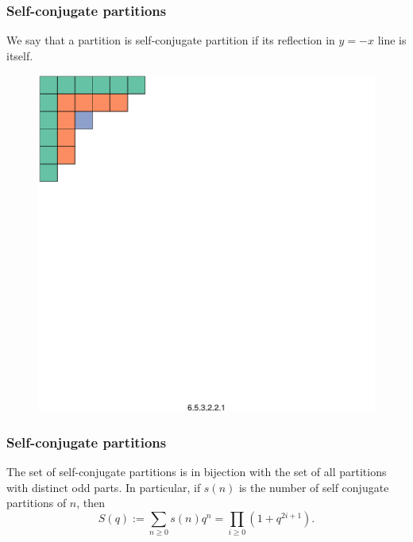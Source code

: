 \documentclass{beamer}
\begin{document}
 
\begin{frame}
	\frametitle{Self-conjugate partitions}
\begin{definition}
We say that a partition is self-conjugate partition if its reflection in $y = -x$ line is itself.	
\end{definition}
\begin{figure}
\includegraphics[scale = 0.6]{SelfConjugate}
\end{figure}
\end{frame}  

\begin{frame}
\frametitle{Self-conjugate partitions}
\begin{theorem}
The set of self-conjugate partitions is in bijection with the set of all partitions with distinct odd parts. In particular, if $s(n)$ is the number of self conjugate partitions of $n$, then
$$S(q) := \sum_{n\geq 0}s(n)q^n = \prod_{i\geq 0}(1+q^{2i+1}).$$
\end{theorem}
\end{frame}
\end{document}
